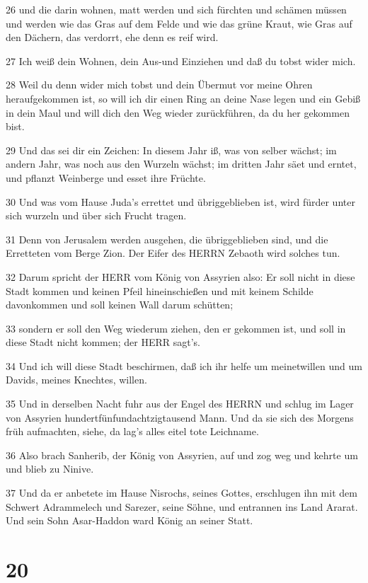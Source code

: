 \par 26 und die darin wohnen, matt werden und sich fürchten und schämen müssen und werden wie das Gras auf dem Felde und wie das grüne Kraut, wie Gras auf den Dächern, das verdorrt, ehe denn es reif wird.
\par 27 Ich weiß dein Wohnen, dein Aus-und Einziehen und daß du tobst wider mich.
\par 28 Weil du denn wider mich tobst und dein Übermut vor meine Ohren heraufgekommen ist, so will ich dir einen Ring an deine Nase legen und ein Gebiß in dein Maul und will dich den Weg wieder zurückführen, da du her gekommen bist.
\par 29 Und das sei dir ein Zeichen: In diesem Jahr iß, was von selber wächst; im andern Jahr, was noch aus den Wurzeln wächst; im dritten Jahr säet und erntet, und pflanzt Weinberge und esset ihre Früchte.
\par 30 Und was vom Hause Juda's errettet und übriggeblieben ist, wird fürder unter sich wurzeln und über sich Frucht tragen.
\par 31 Denn von Jerusalem werden ausgehen, die übriggeblieben sind, und die Erretteten vom Berge Zion. Der Eifer des HERRN Zebaoth wird solches tun.
\par 32 Darum spricht der HERR vom König von Assyrien also: Er soll nicht in diese Stadt kommen und keinen Pfeil hineinschießen und mit keinem Schilde davonkommen und soll keinen Wall darum schütten;
\par 33 sondern er soll den Weg wiederum ziehen, den er gekommen ist, und soll in diese Stadt nicht kommen; der HERR sagt's.
\par 34 Und ich will diese Stadt beschirmen, daß ich ihr helfe um meinetwillen und um Davids, meines Knechtes, willen.
\par 35 Und in derselben Nacht fuhr aus der Engel des HERRN und schlug im Lager von Assyrien hundertfünfundachtzigtausend Mann. Und da sie sich des Morgens früh aufmachten, siehe, da lag's alles eitel tote Leichname.
\par 36 Also brach Sanherib, der König von Assyrien, auf und zog weg und kehrte um und blieb zu Ninive.
\par 37 Und da er anbetete im Hause Nisrochs, seines Gottes, erschlugen ihn mit dem Schwert Adrammelech und Sarezer, seine Söhne, und entrannen ins Land Ararat. Und sein Sohn Asar-Haddon ward König an seiner Statt.

\chapter{20}

